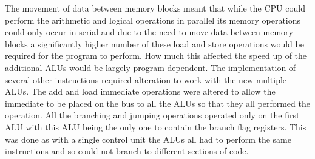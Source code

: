 The movement of data between memory blocks meant that while the CPU could perform the arithmetic and logical operations in parallel its memory operations could only occur in serial and due to the need to move data between memory blocks a significantly higher number of these load and store operations would be required for the program to perform. How much this affected the speed up of the additional ALUs would be largely program dependent. 
The implementation of several other instructions required alteration to work with the new multiple ALUs. The add and load immediate operations were altered to allow the immediate to be placed on the bus to all the ALUs so that they all performed the operation. All the branching and jumping operations operated only on the first ALU with this ALU being the only one to contain the branch flag registers. This was done as with a single control unit the ALUs all had to perform the same instructions and so could not branch to different sections of code.